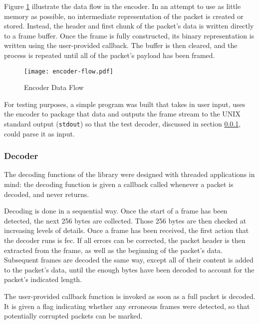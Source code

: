 Figure \ref{fig:encoder-flow} illustrate the data flow in the encoder.
In an attempt to use as little memory as possible, no intermediate
representation of the packet is created or stored. Instead, the header and
first chunk of the packet's data is written directly to a frame buffer. Once
the frame is fully constructed, its binary representation is written using the
user-provided callback. The buffer is then cleared, and the process is repeated
until all of the packet's payload has been framed. 

\begin{figure}[H]
\texttt{[image: encoder-flow.pdf]}
\centering
\caption{Encoder Data Flow}
\label{fig:encoder-flow}
\end{figure}

For testing purposes, a simple program was built that takes in user input,
uses the encoder to package that data and outputs the frame stream to the
UNIX standard output (\texttt{stdout}) so that the test decoder, discussed in
section \ref{sssec:rtx-decoder}, could parse it as input.


\subsubsection{Decoder}
\label{sssec:rtx-decoder}

The decoding functions of the library were designed with threaded applications
in mind: the decoding function is given a callback called whenever a packet
is decoded, and never returns.

Decoding is done in a sequential way. Once the start of a frame has been
detected, the next 256 bytes are collected. Those 256 bytes are then checked
at increasing levels of details. Once a frame has been received, the first
action that the decoder runs is \acrlong{fec}. If all errors can be corrected,
the packet header is then extracted from the frame, as well as the beginning of
the packet's data. Subsequent frames are decoded the same way, except all of
their content is added to the packet's data, until the enough bytes have been
decoded to account for the packet's indicated length.

The user-provided callback function is invoked as soon as a full packet is
decoded. It is given a flag indicating whether any erroneous frames were
detected, so that potentially corrupted packets can be marked.

